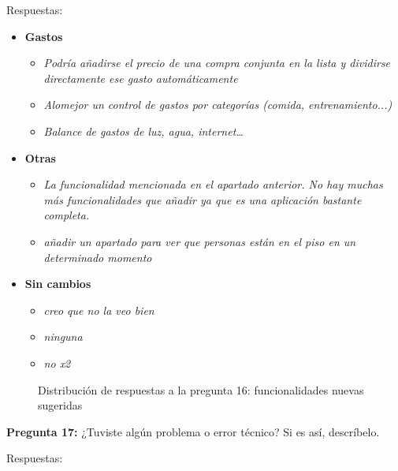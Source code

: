 Respuestas:

\begin{itemize}
    \item \textbf{Gastos}
    \begin{itemize}
        \item \textit{Podría añadirse el precio de una compra conjunta en la lista y dividirse directamente ese gasto automáticamente}
        \item \textit{Alomejor un control de gastos por categorías (comida, entrenamiento...)}
        \item \textit{Balance de gastos de luz, agua, internet…}
    \end{itemize}
    \item \textbf{Otras}
    \begin{itemize}
        \item \textit{La funcionalidad mencionada en el apartado anterior. No hay muchas más funcionalidades que añadir ya que es una aplicación bastante completa.}
        \item \textit{añadir un apartado para ver que personas están en el piso en un determinado momento}
    \end{itemize}
    \item \textbf{Sin cambios}
    \begin{itemize}
        \item \textit{creo que no la veo bien}
        \item \textit{ninguna}
        \item \textit{no x2}
    \end{itemize}
\end{itemize}

\begin{figure}[H]
    \centering
    \caption{Distribución de respuestas a la pregunta 16: funcionalidades nuevas sugeridas}
    \label{fig:funcionalidades-nuevas}
\end{figure}

\textbf{Pregunta 17:} ¿Tuviste algún problema o error técnico? Si es así, descríbelo.

Respuestas: 

